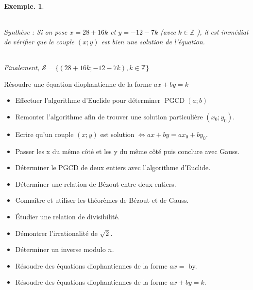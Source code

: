 \documentclass[12pt]{article}
\theoremstyle{break}
\newtheorem*{example}{Exemple.}
\begin{document}
\begin{example}
\begin{enumerate}
~\\Synthèse : Si on pose $x=28+16 k$ et $y=-12-7 k$ (avec $k \in \mathbb{Z}$ ), il est immédiat de vérifier que le couple $(x ; y)$ est bien une solution de l'équation.

~\\Finalement, $\mathcal{S}=\{(28+16 k ;-12-7 k), k \in \mathbb{Z}\}$
\end{enumerate}
\end{example}

\begin{method}{Résoudre une équation diophantienne de la forme $a x+b y=k$}{}
\begin{itemize}[noitemsep,topsep=0pt]
  \item Effectuer l'algorithme d'Euclide pour déterminer $\operatorname{PGCD}(a ; b)$
  \item Remonter l'algorithme afin de trouver une solution particulière $\left(x_{0} ; y_{0}\right)$.
  \item Ecrire qu'un couple $(x ; y)$ est solution $\Longleftrightarrow a x+b y=a x_{0}+b y_{0}$.
  \item Passer les x du même côté et les y du même côté puis conclure avec Gauss.
\end{itemize}
\end{method}

\vspace{1em}

\begin{savoir}{}{}
\begin{itemize}[noitemsep,topsep=0pt]
  \item Déterminer le PGCD de deux entiers avec l'algorithme d'Euclide.
  \item Déterminer une relation de Bézout entre deux entiers.
  \item Connaître et utiliser les théorèmes de Bézout et de Gauss.
  \item Étudier une relation de divisibilité.
  \item Démontrer l'irrationalité de $\sqrt{2}$.
  \item Déterminer un inverse modulo $n$.
  \item Résoudre des équations diophantiennes de la forme $a x=$ by.
  \item Résoudre des équations diophantiennes de la forme $a x + by = k$.
\end{itemize}
\end{savoir}
\end{document}
